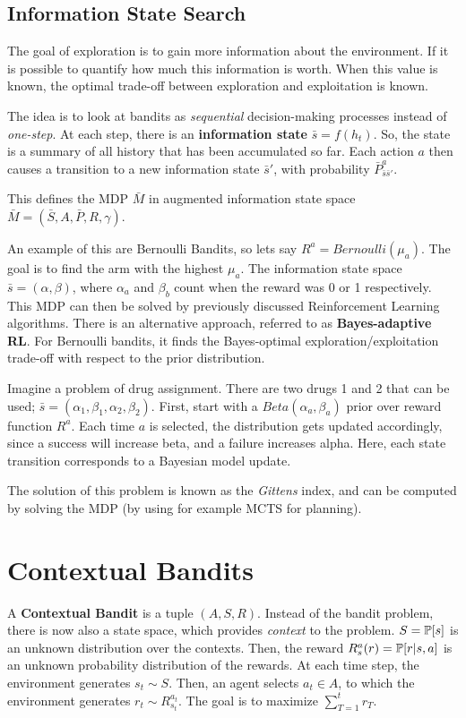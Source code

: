 \subsection{Information State Search}

The goal of exploration is to gain more information about the environment. If it is possible to quantify how much this information is worth. When this value is known, the optimal trade-off between exploration and exploitation is known.

The idea is to look at bandits as \textit{sequential} decision-making processes instead of \textit{one-step}. At each step, there is an \textbf{information state} $\bar{s} = f(h_t)$. So, the state is a summary of all history that has been accumulated so far. Each action $a$ then causes a transition to a new information state $\bar{s}'$, with probability $\bar{P}^a_{\bar{s}\bar{s}'}$.

This defines the MDP $\bar{M}$ in augmented information state space $\bar{M} = (\bar{S}, A, \bar{P}, R, \gamma)$.

An example of this are Bernoulli Bandits, so lets say $R^a = Bernoulli(\mu_a)$. The goal is to find the arm with the highest $\mu_a$. The information state space $\bar{s} = (\alpha, \beta)$, where $\alpha_a$ and $\beta_b$ count when the reward was 0 or 1 respectively.	 This MDP can then be solved by previously discussed Reinforcement Learning algorithms. There is an alternative approach, referred to as \textbf{Bayes-adaptive RL}. For Bernoulli bandits, it finds the Bayes-optimal exploration/exploitation trade-off with respect to the prior distribution.

Imagine a problem of drug assignment. There are two drugs 1 and 2 that can be used; $\bar{s} = (\alpha_1, \beta_1, \alpha_2, \beta_2)$. First, start with a $Beta(\alpha_a, \beta_a)$ prior over reward function $R^a$. Each time $a$ is selected, the distribution gets updated accordingly, since a success will increase beta, and a failure increases alpha. Here, each state transition corresponds to a Bayesian model update. 

The solution of this problem is known as the \textit{Gittens} index, and can be computed by solving the MDP (by using for example MCTS for planning).

\section{Contextual Bandits}

A \textbf{Contextual Bandit} is a tuple $(A, S, R)$. Instead of the bandit problem, there is now also a state space, which provides \textit{context} to the problem. $S = \operatorname{\mathbb{P}}[s]$ is an unknown distribution over the contexts. Then, the reward $R^a_s(r) = \operatorname{\mathbb{P}}[r|s, a]$ is an unknown probability distribution of the rewards. At each time step, the environment generates $s_t \sim S$. Then, an agent selects $a_t \in A$, to which the environment generates $r_t \sim R^{a_t}_{s_t}$. The goal is to maximize $\sum_{T=1}^t r_T$.

